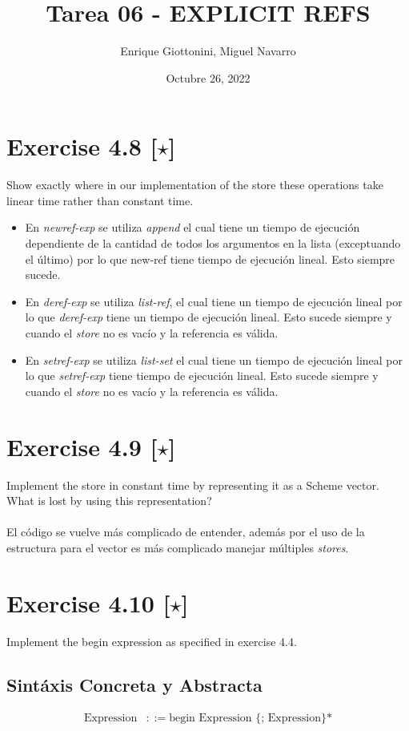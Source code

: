 \documentclass[11pt]{article}
\title{ Tarea 06 - EXPLICIT REFS}
\author{ Enrique Giottonini, Miguel Navarro }
\date{Octubre 26, 2022}
\begin{document}
\maketitle	


\section*{Exercise 4.8 [$\star$]}
Show exactly where in our implementation of the store these operations take linear time rather than constant time.\\
\begin{itemize}


\item En \textit{newref-exp} se utiliza \textit{append} el cual tiene un tiempo de ejecución dependiente de la cantidad de todos los argumentos en la lista (exceptuando el último) por lo que new-ref tiene tiempo de ejecución lineal. Esto siempre sucede.\\
\item En \textit{deref-exp} se utiliza \textit{list-ref}, el cual tiene un tiempo de ejecución lineal por lo que \textit{deref-exp} tiene un tiempo de ejecución lineal. Esto sucede siempre y cuando el \textit{store} no es vacío y la referencia es válida.\\
\item En \textit{setref-exp} se utiliza \textit{list-set} el cual tiene un tiempo de ejecución lineal por lo que \textit{setref-exp} tiene tiempo de ejecución lineal. Esto sucede siempre y cuando el \textit{store} no es vacío y la referencia es válida. \\
\end{itemize}

\section*{Exercise 4.9 [$\star$]}
Implement the store in constant time by representing it as a Scheme
vector. What is lost by using this representation? \\ \\
El código se vuelve más complicado de entender, además por el uso de la estructura para el vector es más complicado manejar múltiples \textit{stores}.
\newpage
\section*{Exercise 4.10 [$\star$]}
Implement the begin expression as speciﬁed in exercise 4.4.
\subsection*{Sintáxis Concreta y Abstracta}
\begin{align*}
\text{Expression}	&::= \text{begin Expression \{; Expression\}*}
\end{align*}
\end{document}
